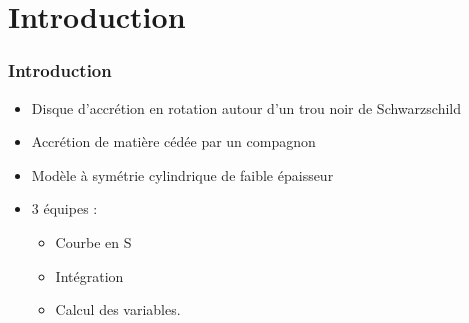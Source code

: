 \section{Introduction}
\begin{frame}
	\frametitle{Introduction}
	
	\begin{itemize}
	    \item Disque d'accrétion en rotation autour d'un trou noir de Schwarzschild
	    \item Accrétion de matière cédée par un compagnon
	    \item Modèle à symétrie cylindrique de faible épaisseur
	    \item 3 équipes :
	    \begin{itemize}
	        \item Courbe en S
	        \item Intégration
	        \item Calcul des variables.
	    \end{itemize}
	\end{itemize}
\end{frame}
